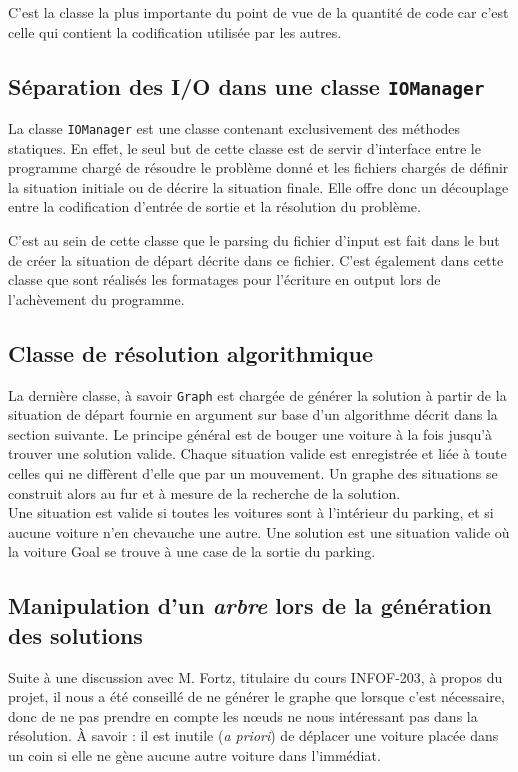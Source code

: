 \documentclass{article}
\begin{document}
		C'est la classe la plus importante du point de vue de la quantité de code car c'est celle qui contient la codification utilisée par les autres.

	\subsection{Séparation des I/O dans une classe \texttt{IOManager}}
		La classe \texttt{IOManager} est une classe contenant exclusivement des méthodes statiques. En effet, le seul but de cette classe
		est de servir d'interface entre le programme chargé de résoudre le problème donné et les fichiers chargés de définir la situation
		initiale ou de décrire la situation finale. Elle offre donc un découplage entre la codification d'entrée de sortie et la résolution
		du problème.

		C'est au sein de cette classe que le parsing du fichier d'input est fait dans le but de créer la situation de départ décrite dans ce fichier.
		C'est également dans cette classe que sont réalisés les formatages pour l'écriture en output lors de l'achèvement du programme.

	\subsection{Classe de résolution algorithmique}
		La dernière classe, à savoir \texttt{Graph} est chargée de générer la solution à partir de la situation de départ fournie en argument
		sur base d'un algorithme décrit dans la section suivante. Le principe général est de bouger une voiture à la fois jusqu'à trouver une
		solution valide. Chaque situation valide est enregistrée et liée à toute celles qui ne diffèrent d'elle que par un mouvement.
		Un graphe des situations se construit alors au fur et à mesure de la recherche de la solution.\\
		Une situation est valide si toutes les voitures sont à l'intérieur du parking, et si aucune voiture n'en chevauche une autre.
		Une solution est une situation valide où la voiture Goal se trouve à une case de la sortie du parking.

	\subsection{Manipulation d'un \textit{arbre} lors de la génération des solutions}
		Suite à une discussion avec M. Fortz, titulaire du cours INFOF-203, à propos du projet, il nous a été conseillé de ne générer le graphe
		que lorsque c'est nécessaire, donc de ne pas prendre en compte les nœuds ne nous intéressant pas dans la résolution. À savoir : il est
		inutile (\textit{a priori}) de déplacer une voiture placée dans un coin si elle ne gène aucune autre voiture dans l'immédiat.
\end{document}
